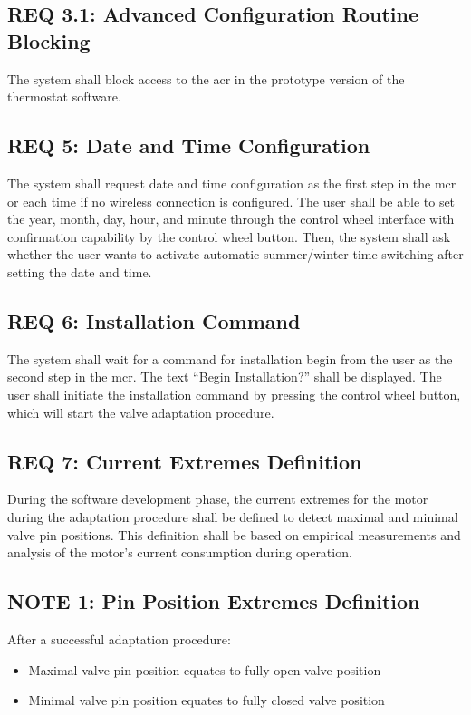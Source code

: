 \subsection*{REQ 3.1: Advanced Configuration Routine Blocking}
\label{subsec:REQ 3.1: Advanced Configuration Routine Blocking}
The system shall block access to the \acs{acr} in the prototype version of the thermostat software.

\subsection*{REQ 5: Date and Time Configuration}
\label{subsec:REQ 5: Date and Time Configuration}
The system shall request date and time configuration as the first step in the \acs{mcr} or each time if no wireless connection is configured. The user shall be able to set the year, month, day, hour, and minute through the control wheel interface with confirmation capability by the control wheel button. Then, the system shall ask whether the user wants to activate automatic summer/winter time switching after setting the date and time.

\subsection*{REQ 6: Installation Command}
\label{subsec:REQ 6: Installation Command}
The system shall wait for a command for installation begin from the user as the second step in the \acs{mcr}. The text ``Begin Installation?'' shall be displayed. The user shall initiate the installation command by pressing the control wheel button, which will start the valve adaptation procedure.

\subsection*{REQ 7: Current Extremes Definition}
\label{subsec:REQ 7: Current Extremes Definition}
During the software development phase, the current extremes for the motor during the adaptation procedure shall be defined to detect maximal and minimal valve pin positions. This definition shall be based on empirical measurements and analysis of the motor's current consumption during operation.

\subsection*{NOTE 1: Pin Position Extremes Definition}
\label{subsec:NOTE 1: Pin Position Extremes Definition}
After a successful adaptation procedure:
\begin{itemize}
    \item Maximal valve pin position equates to fully open valve position
    \item Minimal valve pin position equates to fully closed valve position
\end{itemize}

